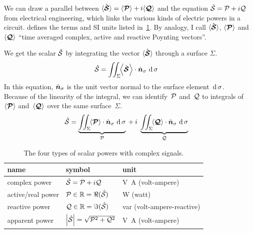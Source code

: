 We can draw a parallel between
$
    \langle \hat{\bm{\mathcal{S}}} \rangle
    =
    \langle \bm{\mathcal{P}} \rangle
    +
    i
    \langle \bm{\mathcal{Q}} \rangle
$
and the equation
$
    \hat{\mathcal{S}} = \mathcal{P} + i\mathcal{Q}
$
from electrical engineering, which links the various kinds of electric powers in a circuit.
\Textcite{IEEE2002dictionary} defines the terms and SI units listed in~\cref{tab:complex_powers}.
By analogy, I call $\langle \hat{\bm{\mathcal{S}}} \rangle$,
$\langle \bm{\mathcal{P}} \rangle$ and
$\langle \bm{\mathcal{Q}} \rangle$ ``time averaged complex, active and reactive Poynting vectors''.

We get the scalar $\hat{\mathcal{S}}$ by integrating the vector $\langle \hat{\bm{\mathcal{S}}} \rangle$ through a surface $\Sigma$.
\begin{equation}
    \cp{\power{S}}
    =
    \iint_\Sigma
    \!
    \Timeavg{\vectcp{\power{S}}}
    \cdot
    \vectu{n}_\sigma
    \,
    \dif\sigma
    \label{eq:complex_power_from_poynting_vector}
\end{equation}
In this equation, $\dot{\bm{n}}_\sigma$ is the unit vector normal to the surface element~$\operatorname{d}\sigma$.
Because of the linearity of the integral, we can identify~$\mathcal{P}$ and~$\mathcal{Q}$
to integrals of~$\Timeavg{\vect{\power{P}}}$ and~$\Timeavg{\vect{\power{Q}}}$
over the same surface~$\Sigma$.
\begin{equation}
    \cp{\power{S}}
    =
    \underbrace{
        \iint_\Sigma
        \!
        \Timeavg{\vect{\power{P}}}
        \cdot
        \vectu{n}_\sigma
        \,
        \dif\sigma
    }_{\power{P}}
    \:
    +
    \:
    i
    \;
    \underbrace{
        \iint_\Sigma
        \!
        \Timeavg{\vect{\power{Q}}}
        \cdot
        \vectu{n}_\sigma
        \,
        \dif\sigma
    }_{\power{Q}}
    \label{eq:active_reactive_power_from_poynting_vector}
\end{equation}

\begin{table}
    \centering
    \begin{tabular}{lll}
        \toprule
        name & symbol & unit\\
        \midrule
        complex power     & $\hat{\mathcal{S}} = \mathcal{P} + i\mathcal{Q}$\quad & \si{\volt\ampere} (volt-ampere) \\
        active/real power & $\mathcal{P} \in \mathbb{R} = \Re(\hat{\mathcal{S}})$\quad & \si{\watt} (watt) \\
        reactive power    & $\mathcal{Q} \in \mathbb{R} = \Im(\hat{\mathcal{S}})$\quad & \si{var} (volt-ampere-reactive) \\
        apparent power    & $\abs{\cp{\power{S}}} = \sqrt{\power{P}^2 + \power{Q}^2}$\quad & \si{\volt\ampere} (volt-ampere) \\
        \bottomrule
    \end{tabular}
    \caption{The four types of scalar powers with complex signals.}
    \label{tab:complex_powers}
\end{table}

